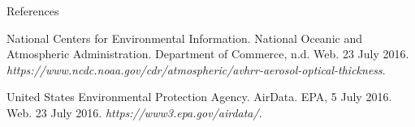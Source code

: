 \documentclass[notheorems,envcountsect,allowframebreaks,xcolor=svgnames,8pt]{beamer}
\newcommand{\rdd}{^{\mbox{\tiny{rd}}}}
\begin{document}
\begin{frame}{References}
	\begin{thebibliography}{99}
	\beamertemplatearticlebibitems
	
	
	 National Centers for Environmental Information. National Oceanic and Atmospheric Administration. Department of Commerce, n.d. Web. 23 July 2016. \textit{https://www.ncdc.noaa.gov/cdr/atmospheric/avhrr-aerosol-optical-thickness}.
	
 United States Environmental Protection Agency. AirData. EPA, 5 July 2016. Web. 23 July 2016. \textit{https://www3.epa.gov/airdata/}.
	

	\end{thebibliography}
%	
%	
%	
%	
\end{frame}
\end{document}
